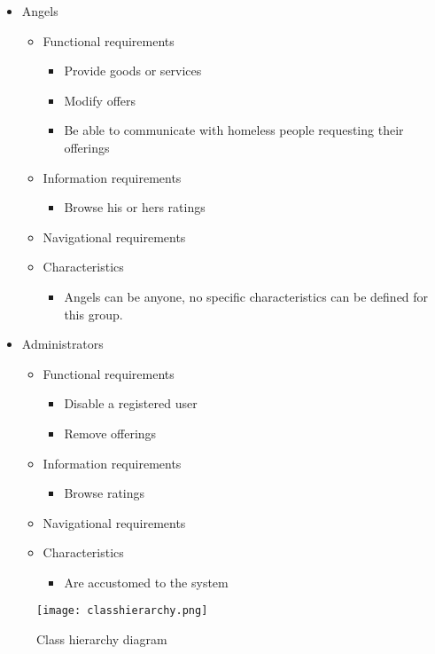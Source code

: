 \documentclass[a4paper]{report}
\begin{document}
\begin{itemize}
\item Angels
\begin{itemize}
\item Functional requirements
\begin{itemize}
	\item Provide goods or services
	\item Modify offers
	\item Be able to communicate with homeless people requesting their offerings
\end{itemize}
\item Information requirements
\begin{itemize}
	\item Browse his or hers ratings
\end{itemize}
\item Navigational requirements
\item Characteristics
\begin{itemize}
	\item Angels can be anyone, no specific characteristics can be defined for this group.
\end{itemize}
\end{itemize}

\item Administrators
\begin{itemize}
\item Functional requirements
\begin{itemize}
	\item Disable a registered user
	\item Remove offerings
\end{itemize}
\item Information requirements
\begin{itemize}
	\item Browse ratings
\end{itemize}
\item Navigational requirements
\item Characteristics
\begin{itemize}
	\item Are accustomed to the system
\end{itemize}
\end{itemize}

\end{itemize}

\begin{figure}[htp]
\centering
\texttt{[image: classhierarchy.png]}
\caption{Class hierarchy diagram}
\label{fig:classhierarchy}
\end{figure}
\end{document}
